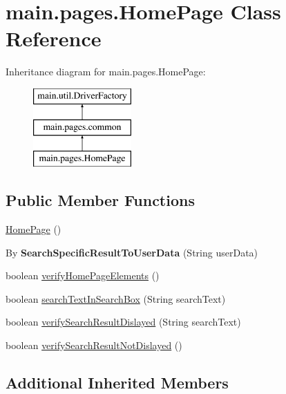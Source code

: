 \hypertarget{classmain_1_1pages_1_1_home_page}{}\section{main.\+pages.\+Home\+Page Class Reference}
\label{classmain_1_1pages_1_1_home_page}
Inheritance diagram for main.\+pages.\+Home\+Page\+:\begin{figure}[H]
\begin{center}
\leavevmode
\includegraphics[height=3.000000cm]{classmain_1_1pages_1_1_home_page}
\end{center}
\end{figure}
\subsection*{Public Member Functions}
\begin{DoxyCompactItemize}
\item 
\mbox{\hyperlink{classmain_1_1pages_1_1_home_page_a7fb96c9279ead0bb1905390008df332b}{Home\+Page}} ()
\item 
\mbox{\label{classmain_1_1pages_1_1_home_page_a488bb73f12e82d543ad669398851b698}} 
By {\bfseries Search\+Specific\+Result\+To\+User\+Data} (String user\+Data)
\item 
boolean \mbox{\hyperlink{classmain_1_1pages_1_1_home_page_ab12db71ec89778964fe831fdbc8f78d2}{verify\+Home\+Page\+Elements}} ()
\item 
boolean \mbox{\hyperlink{classmain_1_1pages_1_1_home_page_a4ea73ab43b733f85412185481f7cfbe5}{search\+Text\+In\+Search\+Box}} (String search\+Text)
\item 
boolean \mbox{\hyperlink{classmain_1_1pages_1_1_home_page_a23f149b5230539d36088c9d85ddd6fa7}{verify\+Search\+Result\+Dislayed}} (String search\+Text)
\item 
boolean \mbox{\hyperlink{classmain_1_1pages_1_1_home_page_a08b21c4d5923e0fc37c258ed4b854f37}{verify\+Search\+Result\+Not\+Dislayed}} ()
\end{DoxyCompactItemize}
\subsection*{Additional Inherited Members}


